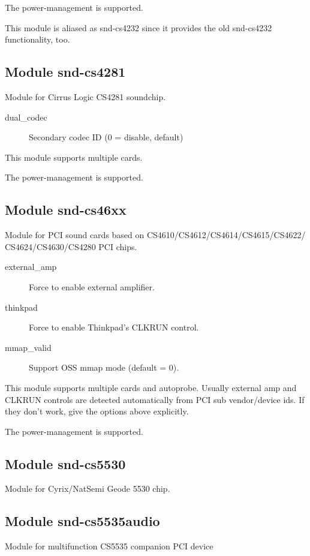 \documentclass[a4paper,8pt,english]{sphinxmanual}
\begin{document}
The power-management is supported.

This module is aliased as snd-cs4232 since it provides the old
snd-cs4232 functionality, too.


\subsection{Module snd-cs4281}
\label{sound/alsa-configuration:module-snd-cs4281}
Module for Cirrus Logic CS4281 soundchip.
\begin{description}
\item[{dual\_codec}] \leavevmode
Secondary codec ID (0 = disable, default)

\end{description}

This module supports multiple cards.

The power-management is supported.


\subsection{Module snd-cs46xx}
\label{sound/alsa-configuration:module-snd-cs46xx}
Module for PCI sound cards based on CS4610/CS4612/CS4614/CS4615/CS4622/
CS4624/CS4630/CS4280 PCI chips.
\begin{description}
\item[{external\_amp}] \leavevmode
Force to enable external amplifier.

\item[{thinkpad}] \leavevmode
Force to enable Thinkpad's CLKRUN control.

\item[{mmap\_valid}] \leavevmode
Support OSS mmap mode (default = 0).

\end{description}

This module supports multiple cards and autoprobe.
Usually external amp and CLKRUN controls are detected automatically
from PCI sub vendor/device ids.  If they don't work, give the options
above explicitly.

The power-management is supported.


\subsection{Module snd-cs5530}
\label{sound/alsa-configuration:module-snd-cs5530}
Module for Cyrix/NatSemi Geode 5530 chip.


\subsection{Module snd-cs5535audio}
\label{sound/alsa-configuration:module-snd-cs5535audio}
Module for multifunction CS5535 companion PCI device
\end{document}
